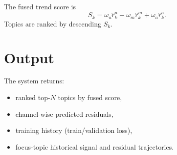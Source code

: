\documentclass[11pt]{article}
\begin{document}
The fused trend score is
\begin{equation}
S_k = \omega_u\widehat{r}^u_k + \omega_m\widehat{r}^m_k + \omega_a\widehat{r}^a_k.
\end{equation}
Topics are ranked by descending $S_k$.

\section{Output}
The system returns:
\begin{itemize}[leftmargin=1.5em]
  \item ranked top-$N$ topics by fused score,
  \item channel-wise predicted residuals,
  \item training history (train/validation loss),
  \item focus-topic historical signal and residual trajectories.
\end{itemize}
\end{document}

